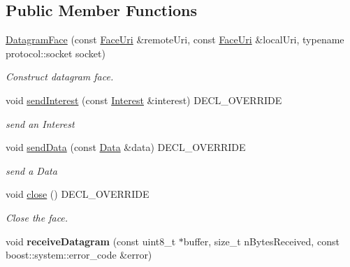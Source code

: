 \subsection*{Public Member Functions}
\begin{DoxyCompactItemize}
\item 
\hyperlink{classnfd_1_1DatagramFace_aff9457ec87fd4d81bd80e0a294f0bce5}{Datagram\+Face} (const \hyperlink{classndn_1_1util_1_1FaceUri}{Face\+Uri} \&remote\+Uri, const \hyperlink{classndn_1_1util_1_1FaceUri}{Face\+Uri} \&local\+Uri, typename protocol\+::socket socket)
\begin{DoxyCompactList}\small\item\em Construct datagram face. \end{DoxyCompactList}\item 
void \hyperlink{classnfd_1_1DatagramFace_a87665f3023310f6dff9abd5684a34533}{send\+Interest} (const \hyperlink{classndn_1_1Interest}{Interest} \&interest) D\+E\+C\+L\+\_\+\+O\+V\+E\+R\+R\+I\+DE\hypertarget{classnfd_1_1DatagramFace_a87665f3023310f6dff9abd5684a34533}{}\label{classnfd_1_1DatagramFace_a87665f3023310f6dff9abd5684a34533}

\begin{DoxyCompactList}\small\item\em send an Interest \end{DoxyCompactList}\item 
void \hyperlink{classnfd_1_1DatagramFace_a654b94a4545758da6b86d8cd63a9e252}{send\+Data} (const \hyperlink{classndn_1_1Data}{Data} \&data) D\+E\+C\+L\+\_\+\+O\+V\+E\+R\+R\+I\+DE\hypertarget{classnfd_1_1DatagramFace_a654b94a4545758da6b86d8cd63a9e252}{}\label{classnfd_1_1DatagramFace_a654b94a4545758da6b86d8cd63a9e252}

\begin{DoxyCompactList}\small\item\em send a Data \end{DoxyCompactList}\item 
void \hyperlink{classnfd_1_1DatagramFace_a8f0033a2ec639a55501793978e355bdf}{close} () D\+E\+C\+L\+\_\+\+O\+V\+E\+R\+R\+I\+DE
\begin{DoxyCompactList}\small\item\em Close the face. \end{DoxyCompactList}\item 
void {\bfseries receive\+Datagram} (const uint8\+\_\+t $\ast$buffer, size\+\_\+t n\+Bytes\+Received, const boost\+::system\+::error\+\_\+code \&error)\hypertarget{classnfd_1_1DatagramFace_a425099976eda52154c69d5df3cafa7b3}{}\label{classnfd_1_1DatagramFace_a425099976eda52154c69d5df3cafa7b3}

\end{DoxyCompactItemize}
